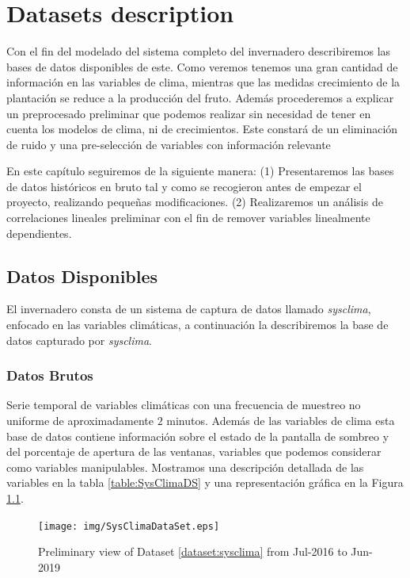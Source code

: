\chapter{Datasets description}


Con el fin del modelado del sistema completo del invernadero describiremos las bases de datos disponibles de este. Como veremos tenemos una gran cantidad de información en las variables de clima, mientras que las medidas  crecimiento de la plantación se reduce a la producción del fruto. Además procederemos a explicar un preprocesado preliminar que podemos realizar sin necesidad de tener en cuenta los modelos de clima, ni de crecimientos. Este constará de un eliminación de ruido y una pre-selección de variables con información relevante

En este capítulo seguiremos de la siguiente manera: (1) Presentaremos las bases de datos históricos en bruto tal y como se recogieron antes de empezar el proyecto, realizando pequeñas modificaciones. (2) Realizaremos un análisis de correlaciones lineales preliminar con el fin de remover variables linealmente dependientes. 
\section{Datos Disponibles}


El invernadero consta de un sistema de captura de datos llamado \emph{sysclima}, enfocado en las variables climáticas, a continuación la describiremos la base de datos capturado por \emph{sysclima}. 

\subsection{Datos Brutos}
\begin{dataset}\label{dataset:sysclima}
    Serie temporal de variables climáticas con una frecuencia de muestreo no uniforme de aproximadamente $2$ minutos. Además de las variables de clima esta base de datos contiene información sobre el estado de la pantalla de sombreo y del porcentaje de apertura de las ventanas, variables que podemos considerar como variables manipulables. Mostramos una descripción detallada de las variables en la tabla \ref{table:SysClimaDS} y una representación gráfica en la Figura \ref{fig:ViewDataSetSysClima}.
\end{dataset}


\begin{figure}[ht!]
    \centering
    \texttt{[image: img/SysClimaDataSet.eps]}
    \caption{Preliminary view of Dataset \ref{dataset:sysclima} from Jul-2016 to Jun-2019 }
    \label{fig:ViewDataSetSysClima}
\end{figure}

